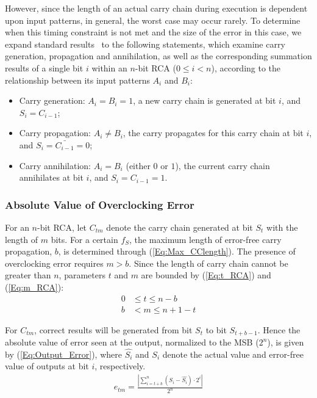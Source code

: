 \documentclass[prodmode,acmtrets]{acmsmall} %
\begin{document}
However, since the length of an actual carry chain during execution is dependent upon input patterns, in general, the worst case may occur rarely. To determine when this timing constraint is not met and the size of the error in this case, we expand standard results~\cite{DigitalICDesign} to the following statements, which examine carry generation, propagation and annihilation, as well as the corresponding summation results of a single bit $i$ within an $n$-bit RCA ($0\leq i<n$), according to the relationship between its input patterns $A_i$ and $B_i$:
%
 \begin{itemize}
   \item Carry generation: $A_i=B_i=1$, a new carry chain is generated at bit $i$, and $S_i=C_{i-1}$;
   \item Carry propagation: $A_i\neq B_i$, the carry propagates for this carry chain at bit $i$, and $S_i=\bar{C_{i-1}}=0$;
   \item Carry annihilation: $A_i=B_i$ (either $0$ or $1$), the current carry chain annihilates at bit $i$, and $S_i=C_{i-1}=1$.
 \end{itemize}

 \subsubsection{Absolute Value of Overclocking Error}
For an $n$-bit RCA, let $C_{tm}$ denote the carry chain generated at bit $S_t$ with the length of $m$ bits. For a certain $f_S$, the maximum length of error-free carry propagation, $b$, is determined through (\ref{Eq:Max_CClength}). The presence of overclocking error requires $m>b$. Since the length of carry chain cannot be greater than $n$, parameters $t$ and $m$ are bounded by (\ref{Eq:t_RCA}) and (\ref{Eq:m_RCA}):
%
\begin{align}
  \label{Eq:t_RCA}  0&\leq t \leq n-b\\
    b&<m\leq n+1-t      \label{Eq:m_RCA}
\end{align}

For $C_{tm}$, correct results will be generated from bit $S_t$ to bit $S_{t+b-1}$. Hence the absolute value of error seen at the output, normalized to the MSB ($2^n$), is given by (\ref{Eq:Output_Error}), where $\hat{S_i}$ and $S_i$ denote the actual value and error-free value of outputs at bit $i$, respectively.
%
\begin{eqnarray}\label{Eq:Output_Error}
    e_{tm}=\frac{\left|\sum_{i=t+b}^{n}(S_i-\hat{S_i})\cdot 2^i\right|}{2^n}
\end{eqnarray}
\end{document}
